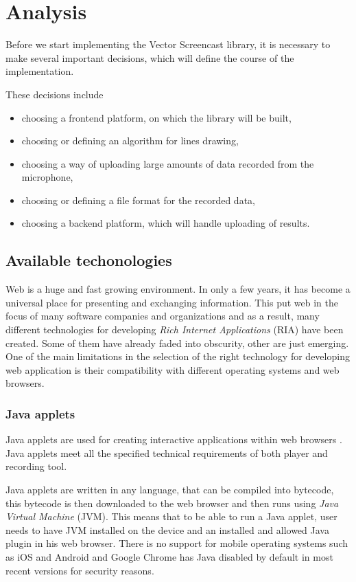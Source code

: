\chapter{Analysis}

Before we start implementing the Vector Screencast library, it is necessary to make several important decisions, which will define the course of the implementation. 

These decisions include
\begin{itemize}
	\item choosing a frontend platform, on which the library will be built,
	\item choosing or defining an algorithm for lines drawing,
	\item choosing a way of uploading large amounts of data recorded from the microphone,
	\item choosing or defining a file format for the recorded data,
	\item choosing a backend platform, which will handle uploading of results.
\end{itemize}

\section{Available techonologies}

Web is a huge and fast growing environment. In only a few years, it has become a universal place for presenting and exchanging information. This put web in the focus of many software companies and organizations and as a result, many different technologies for developing \textit{Rich Internet Applications} (RIA) have been created. Some of them have already faded into obscurity, other are just emerging. One of the main limitations in the selection of the right technology for developing web application is their compatibility with different operating systems and web browsers.

\subsection{Java applets}
Java applets are used for creating interactive applications within web browsers \cite{java}. Java applets meet all the specified technical requirements of both player and recording tool.

Java applets are written in any language, that can be compiled into bytecode, this bytecode is then downloaded to the web browser and then runs using \textit{Java Virtual Machine} (JVM). This means that to be able to run a Java applet, user needs to have JVM installed on the device and an installed and allowed Java plugin in his web browser. There is no support for mobile operating systems such as iOS and Android \cite{java_mobile} and Google Chrome has Java disabled by default in most recent versions  for security reasons.


